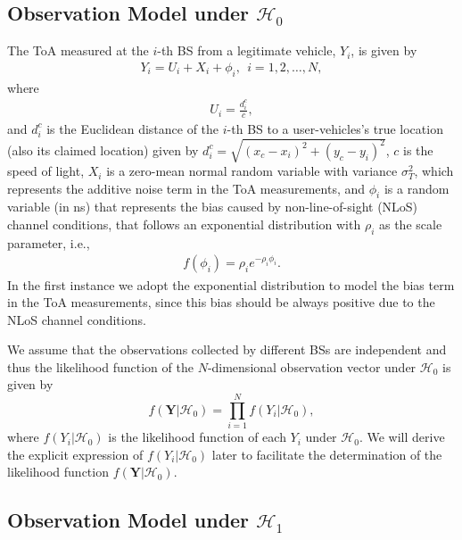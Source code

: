 \documentclass[journal]{IEEEtran}
\newcommand{\Hnull}{\mathcal{H}_0}
\newcommand{\Halt}{\mathcal{H}_1}
\begin{document}
\subsection{Observation Model under $\Hnull$}

The ToA measured at the $i$-th BS from a legitimate vehicle, $Y_i$, is given by
\begin{eqnarray}\label{observ_H0}
Y_i = U_i + X_i + \phi_i, ~~i = 1, 2, \dots, N,
\end{eqnarray}
where
\begin{eqnarray}\label{equation_9}
U_i = \frac{d_i^c}{c},
\end{eqnarray}
and $d_i^c$ is the Euclidean distance of the $i$-th BS to a user-vehicles's true location (also its claimed location) given by $d_i^c = \sqrt{(x_c - x_i)^2 + (y_c - y_i)^2}$, $c$ is the speed of light, $X_i$ is a zero-mean normal random variable with variance $\sigma_{T}^2$, which represents the additive noise term in the ToA measurements, and $\phi_i$ is a random variable (in ns) that represents the bias caused by non-line-of-sight (NLoS) channel conditions, that follows an exponential distribution with $\rho_i$ as the scale parameter, i.e.,
\begin{align}\label{exponential_bias}
f(\phi_i) = \rho_i e^{-\rho_i \phi_i}.
\end{align}
 In the first instance we adopt the exponential distribution to model the bias term in the ToA measurements, since this bias  should be always positive due to the NLoS channel conditions.

We assume that the observations collected by different BSs are independent and thus the likelihood function of the $N$-dimensional observation vector under $\Hnull$ is given by
\begin{equation}\label{likelihood_H0}
f\left(\mathbf{Y}|\Hnull\right) = \prod_{i=1}^N f\left(Y_i|\Hnull\right),
\end{equation}
where $f\left(Y_i|\Hnull\right)$ is the likelihood function of each $Y_i$ under $\Hnull$. We will derive the explicit expression of $f\left(Y_i|\Hnull\right)$ later to facilitate the determination of the likelihood function $f\left(\mathbf{Y}|\Hnull\right)$.

\subsection{Observation Model under $\Halt$}
\end{document}
